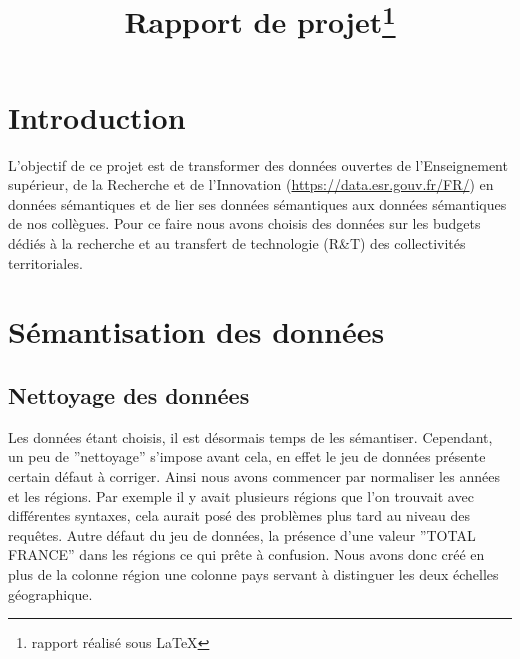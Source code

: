 \documentclass[a4paper,sffamily,12pt]{article}
\title{\vspace{\fill}\LARGE\bfseries\sffamily Rapport de projet\protect\footnote{rapport réalisé sous \LaTeX} \vspace{\fill}}
\begin{document}
	\date{} %
	\maketitle %

	\thispagestyle{fancy} %
	
	\newpage
			
	\renewcommand{\contentsname}{Sommaire}
	\tableofcontents
	
	\newpage
	
	\section{Introduction}

		\vspace{0.5cm}

		L’objectif de ce projet est de transformer des données ouvertes de l'Enseignement supérieur, de la Recherche et de l'Innovation (\url{https://data.esr.gouv.fr/FR/}) en données sémantiques et de lier ses données sémantiques aux données sémantiques de nos collègues. Pour ce faire nous avons choisis des données sur les budgets dédiés à la recherche et au transfert de technologie (R\&T) des collectivités territoriales. \\
		
		\vspace{0.5cm}
		
	\section{Sémantisation des données}				

		\vspace{0.5cm}
		
		\subsection{Nettoyage des données}
			
			\vspace{0.5cm}
			
			Les données étant choisis, il est désormais temps de les sémantiser. Cependant, un peu de ''nettoyage'' s'impose avant cela, en effet le jeu de données présente certain défaut à corriger. Ainsi nous avons commencer par normaliser les années et les régions. Par exemple il y avait plusieurs régions que l'on trouvait avec différentes syntaxes, cela aurait posé des problèmes plus tard au niveau des requêtes. Autre défaut du jeu de données, la présence d'une valeur ''TOTAL FRANCE'' dans les régions ce qui prête à confusion. Nous avons donc créé en plus de la colonne région une colonne pays servant à distinguer les deux échelles géographique.
		
\end{document}
